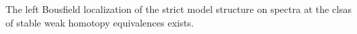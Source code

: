 \begin{theorem} \label{theorem:stable_model_structure_topological_spectra}
    The left Bousfield localization of the strict model structure on spectra at the clsas of stable weak homotopy equivalences exists.
\end{theorem}